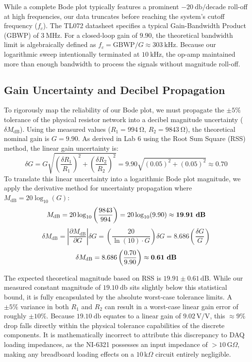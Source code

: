 \documentclass[11pt]{article}
\begin{document}
While a complete Bode plot typically features a prominent $\SI{-20}{\decibel}\text{/decade}$ roll-off at high frequencies, our data truncates before reaching the system's cutoff frequency ($f_c$). The TL072 datasheet specifies a typical Gain-Bandwidth Product (GBWP) of $\SI{3}{\mega\hertz}$. For a closed-loop gain of $9.90$, the theoretical bandwidth limit is algebraically defined as $f_c = \text{GBWP} / G \approx \SI{303}{\kilo\hertz}$. Because our logarithmic sweep intentionally terminated at $\SI{10}{\kilo\hertz}$, the op-amp maintained more than enough bandwidth to process the signals without magnitude roll-off.

\subsection{Gain Uncertainty and Decibel Propagation}
To rigorously map the reliability of our Bode plot, we must propagate the $\pm 5\%$ tolerance of the physical resistor network into a decibel magnitude uncertainty ($\delta M_{\text{dB}}$). Using the measured values ($R_1 = \SI{994}{\ohm}$, $R_2 = \SI{9843}{\ohm}$), the theoretical nominal gain is $G = 9.90$. As derived in Lab 6 using the Root Sum Square (RSS) method, the linear gain uncertainty is:
\[ \delta G = G \sqrt{\left(\frac{\delta R_1}{R_1}\right)^2 + \left(\frac{\delta R_2}{R_2}\right)^2} = 9.90 \sqrt{(0.05)^2 + (0.05)^2} \approx 0.70 \]
To translate this linear uncertainty into a logarithmic Bode plot magnitude, we apply the derivative method for uncertainty propagation where $M_{\text{dB}} = 20 \log_{10}(G)$:
\[ M_{\text{dB}} = 20 \log_{10} \left( \frac{9843}{994} \right) = 20 \log_{10} (9.90) \approx \mathbf{19.91 \text{ \textbf{dB}}} \]
\[ \delta M_{\text{dB}} = \left| \frac{\partial M_{\text{dB}}}{\partial G} \right| \delta G = \left( \frac{20}{\ln(10) \cdot G} \right) \delta G = 8.686 \left( \frac{\delta G}{G} \right) \]
\[ \delta M_{\text{dB}} = 8.686 \left( \frac{0.70}{9.90} \right) \approx \mathbf{0.61 \text{ \textbf{dB}}} \]

The expected theoretical magnitude based on RSS is $19.91 \pm 0.61\,\text{dB}$. While our measured constant magnitude of $\SI{19.10}{\decibel}$ sits slightly below this statistical bound, it is fully encapsulated by the absolute worst-case tolerance limits. A $\pm 5\%$ variance in both $R_1$ and $R_2$ can result in a worst-case linear gain error of roughly $\pm 10\%$. Because $\SI{19.10}{\decibel}$ equates to a linear gain of $9.02\,\text{V/V}$, this $\approx 9\%$ drop falls directly within the physical tolerance capabilities of the discrete components. It is mathematically incorrect to attribute this discrepancy to DAQ loading impedances, as the NI-6321 possesses an input impedance of $>10\,\text{G}\Omega$, making any breadboard loading effects on a $10\,\text{k}\Omega$ circuit entirely negligible.
\end{document}
